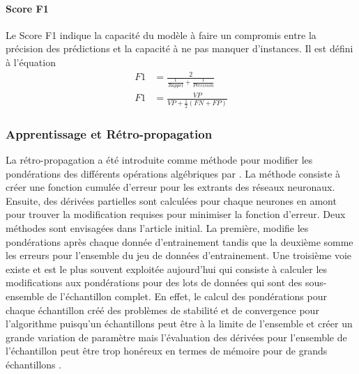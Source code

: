       \paragraph{Score F1}
      Le Score F1 indique la capacité du modèle à faire un compromis entre la précision des prédictions et la capacité à ne pas manquer d'instances. Il est défini à l'équation 
      \begin{align}
        F1 & = \frac{2}{\frac{1}{Rappel} + \frac{1}{Precision}}\label{eq:F1_1}\\
        F1 & = \frac{VP}{VP + \frac{1}{2} (FN + FP)}
      \end{align}
    \subsubsection{Apprentissage et Rétro-propagation}
      La rétro-propagation a été introduite comme méthode pour modifier les pondérations des différents opérations algébriques par \textcite{Rumelhart:LearningRepresentations:1986}. La méthode consiste à créer une fonction cumulée d'erreur pour les extrants des réseaux neuronaux. Ensuite, des dérivées partielles sont calculées pour chaque neurones en amont pour trouver la modification requises pour minimiser la fonction d'erreur. Deux méthodes sont envisagées dans l'article initial. La première, modifie les pondérations après chaque donnée d'entrainement tandis que la deuxième somme les erreurs pour l'ensemble du jeu de données d'entrainement. Une troisième voie existe et est le plus souvent exploitée aujourd'hui qui consiste à calculer les modifications aux pondérations pour des lots de données qui sont des sous-ensemble de l'échantillon complet. En effet, le calcul des pondérations pour chaque échantillon créé des problèmes de stabilité et de convergence pour l'algorithme puisqu'un échantillons peut être à la limite de l'ensemble et créer un grande variation de paramètre mais l'évaluation des dérivées pour l'ensemble de l'échantillon peut être trop honéreux en termes de mémoire pour de grands échantillons \parencite{Wallach:DeepLearning:2024}.  \par
      
